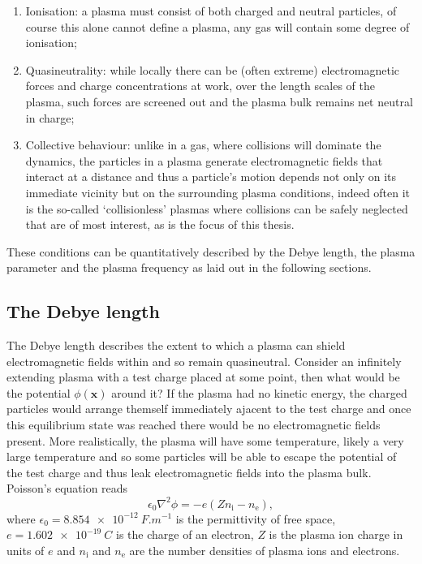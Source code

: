 \begin{enumerate}
	\item Ionisation: a plasma must consist of both charged and neutral particles, of course this alone cannot define a plasma, any gas will contain some degree of ionisation;
	\item Quasineutrality: while locally there can be (often extreme) electromagnetic forces and charge concentrations at work, over the length scales of the plasma, such forces are screened out and the plasma bulk remains net neutral in charge;
	\item Collective behaviour: unlike in a gas, where collisions will dominate the dynamics, the particles in a plasma generate electromagnetic fields that interact at a distance and thus a particle's motion depends not only on its immediate vicinity but on the surrounding plasma conditions, indeed often it is the so-called `collisionless' plasmas where collisions can be safely neglected that are of most interest, as is the focus of this thesis.
\end{enumerate}

These conditions can be quantitatively described by the Debye length, the plasma parameter and the plasma frequency as laid out in the following sections.

\subsection{\label{sec:debye_length}The Debye length}
The Debye length describes the extent to which a plasma can shield electromagnetic fields within and so remain quasineutral. Consider an infinitely extending plasma with a test charge placed at some point, then what would be the potential $\phi(\mathbf{x})$ around it? If the plasma had no kinetic energy, the charged particles would arrange themself immediately ajacent to the test charge and once this equilibrium state was reached there would be no electromagnetic fields present. More realistically, the plasma will have some temperature, likely a very large temperature and so some particles will be able to escape the potential of the test charge and thus leak electromagnetic fields into the plasma bulk. Poisson's equation reads
\begin{equation}\label{eq:poisson}
	\epsilon_0\nabla^2\phi = -e(Zn_\mathrm{i} - n_\mathrm{e}),
\end{equation}
where $\epsilon_0 = \qty{8.854e-12}{F.m^{-1}}$ is the permittivity of free space, $e = \qty{1.602e-19}{C}$ is the charge of an electron, $Z$ is the plasma ion charge in units of $e$ and $n_\mathrm{i}$ and $n_\mathrm{e}$ are the number densities of plasma ions and electrons.

